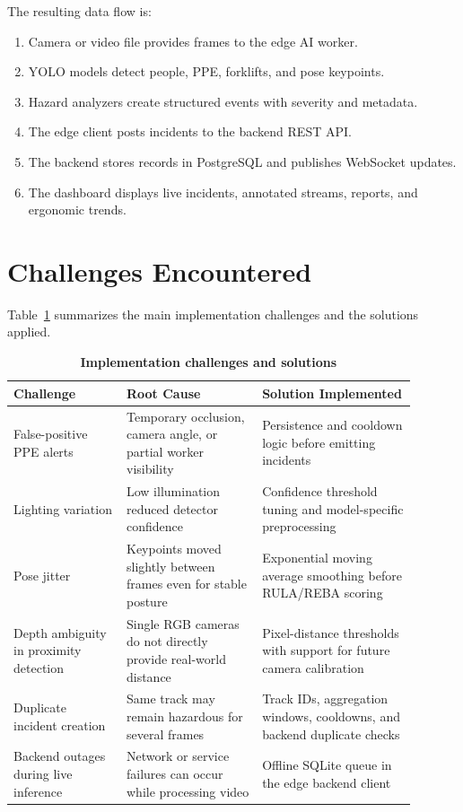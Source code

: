 The resulting data flow is:

\begin{enumerate}
\item Camera or video file provides frames to the edge AI worker.
\item YOLO models detect people, PPE, forklifts, and pose keypoints.
\item Hazard analyzers create structured events with severity and metadata.
\item The edge client posts incidents to the backend REST API.
\item The backend stores records in PostgreSQL and publishes WebSocket updates.
\item The dashboard displays live incidents, annotated streams, reports, and ergonomic trends.
\end{enumerate}

\section{Challenges Encountered}

Table~\ref{tab:chapter5-challenges} summarizes the main implementation challenges and the solutions applied.

\begin{table}[H]
\centering
\footnotesize
\renewcommand{\arraystretch}{1.45}
\begin{tabular}{|p{0.25\linewidth}|p{0.3\linewidth}|p{0.34\linewidth}|}
\hline
\textbf{Challenge} & \textbf{Root Cause} & \textbf{Solution Implemented} \\
\hline
False-positive PPE alerts & Temporary occlusion, camera angle, or partial worker visibility & Persistence and cooldown logic before emitting incidents \\
\hline
Lighting variation & Low illumination reduced detector confidence & Confidence threshold tuning and model-specific preprocessing \\
\hline
Pose jitter & Keypoints moved slightly between frames even for stable posture & Exponential moving average smoothing before RULA/REBA scoring \\
\hline
Depth ambiguity in proximity detection & Single RGB cameras do not directly provide real-world distance & Pixel-distance thresholds with support for future camera calibration \\
\hline
Duplicate incident creation & Same track may remain hazardous for several frames & Track IDs, aggregation windows, cooldowns, and backend duplicate checks \\
\hline
Backend outages during live inference & Network or service failures can occur while processing video & Offline SQLite queue in the edge backend client \\
\hline
\end{tabular}
\caption{\textbf{Implementation challenges and solutions}}
\label{tab:chapter5-challenges}
\end{table}

